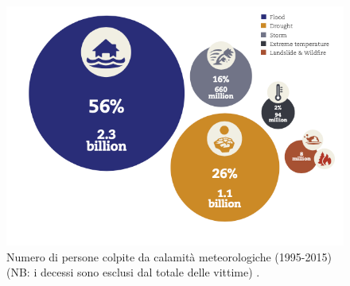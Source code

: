 \begin{figure}[h!]
    \includegraphics[scale=0.6]{img/stat2.png}
    \caption{Numero di persone colpite da calamità meteorologiche (1995-2015) (NB: i decessi sono esclusi dal totale delle vittime) \cite{2015human}.}
    \label{fig:flood_damage}
\end{figure}


